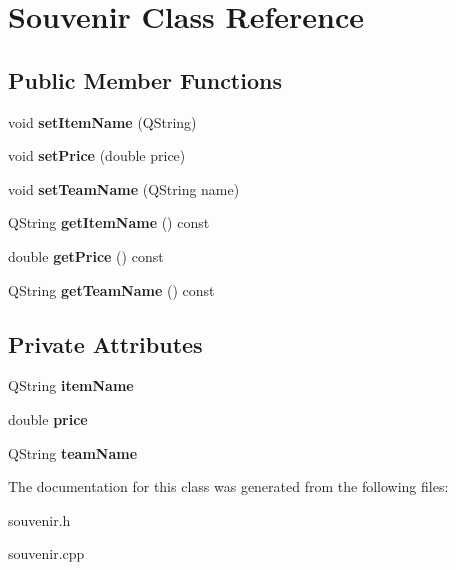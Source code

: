 \hypertarget{class_souvenir}{}\section{Souvenir Class Reference}
\label{class_souvenir}
\subsection*{Public Member Functions}
\begin{DoxyCompactItemize}
\item 
\mbox{\label{class_souvenir_a968ad05d980d8284b891d760b4338553}} 
void {\bfseries set\+Item\+Name} (Q\+String)
\item 
\mbox{\label{class_souvenir_a3664ce2aa3d258e6bf21e2f0f3741efe}} 
void {\bfseries set\+Price} (double price)
\item 
\mbox{\label{class_souvenir_aadd5431a88f683445ce407cbfd4b0390}} 
void {\bfseries set\+Team\+Name} (Q\+String name)
\item 
\mbox{\label{class_souvenir_a0b74aa98dac5f6d6b2541752ec431a82}} 
Q\+String {\bfseries get\+Item\+Name} () const
\item 
\mbox{\label{class_souvenir_aa3dfe5b64bfc5e3785cefd90759e281f}} 
double {\bfseries get\+Price} () const
\item 
\mbox{\label{class_souvenir_ab52b658cab6e30ca568a70df08797d8c}} 
Q\+String {\bfseries get\+Team\+Name} () const
\end{DoxyCompactItemize}
\subsection*{Private Attributes}
\begin{DoxyCompactItemize}
\item 
\mbox{\label{class_souvenir_adbd556e3c1c0404bf71ea1d87100c091}} 
Q\+String {\bfseries item\+Name}
\item 
\mbox{\label{class_souvenir_a2991e814ee69fba3a86d90b7ea48cb2b}} 
double {\bfseries price}
\item 
\mbox{\label{class_souvenir_a134e714c71e99d082304e0e332d5ce0d}} 
Q\+String {\bfseries team\+Name}
\end{DoxyCompactItemize}


The documentation for this class was generated from the following files\+:\begin{DoxyCompactItemize}
\item 
souvenir.\+h\item 
souvenir.\+cpp\end{DoxyCompactItemize}
